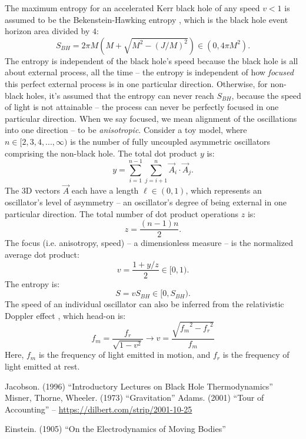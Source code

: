 \documentclass[12pt]{article}
\begin{document}
The maximum entropy for an accelerated Kerr black hole of any speed $v < 1$ is assumed to be the Bekenstein-Hawking entropy \cite{jacobson}, which is the black hole event horizon area divided by $4$:
\begin{equation}
S_{BH} = 2 \pi M \left(M + \sqrt{M^2 - (J/M)^2}\right) \in (0, 4\pi M^2).
\end{equation}
The entropy is independent of the black hole's speed because the black hole is all about external process, all the time -- the entropy is independent of how \textit{focused} this perfect external process is in one particular direction.
Otherwise, for non-black holes, it's assumed that the entropy can never reach $S_{BH}$, because the speed of light is not attainable -- the process can never be perfectly focused in one particular direction.
When we say focused, we mean alignment of the oscillations into one direction -- to be \textit{anisotropic}.
Consider a toy model, where $n \in [2, 3, 4, ..., \infty)$ is the number of fully uncoupled asymmetric oscillators comprising the non-black hole.
The total dot product $y$ is:
\begin{equation}
y = \sum_{i = 1}^{n - 1}  \sum_{j = i + 1}^{n} {\vec{A}}_i  \cdot {\vec{A}}_j.
\end{equation}
The 3D vectors ${\vec{A}}$ each have a length $\ell \in (0, 1)$, which represents an oscillator's level of asymmetry -- an oscillator's degree of being external in one particular direction.
The total number of dot product operations $z$ is:
\begin{equation}
z = \frac{(n - 1)n}{2}.
\end{equation}
The focus (i.e. anisotropy, speed) -- a dimensionless measure -- is the normalized average dot product:
\begin{equation}
v = \frac{1 + {y}/{z}}{2} \in [0, 1).
\end{equation}
The entropy is:
\begin{equation}
S = v S_{BH} \in [0,  S_{BH}).
\end{equation}
The speed of an individual oscillator can also be inferred from the relativistic Doppler effect \cite{ae}, which head-on is:
\begin{equation}
f_m = \frac{f_r}{\sqrt{1 - v^2}} \rightarrow v = \frac{\sqrt{{f_m}^2 - {f_r}^2}}{f_m}
\end{equation}
Here, $f_m$ is the frequency of light emitted in motion, and $f_r$ is the frequency of light emitted at rest.



\pagebreak


\begin{thebibliography}{9}
 Jacobson. (1996) ``Introductory Lectures on Black Hole Thermodynamics''
 Misner, Thorne, Wheeler. (1973) ``Gravitation''
 Adams. (2001) ``Tour of Accounting'' -- \url{https://dilbert.com/strip/2001-10-25}

 Einstein. (1905) ``On the Electrodynamics of Moving Bodies''

\end{thebibliography}
\end{document}
